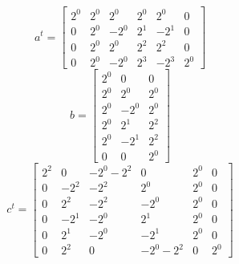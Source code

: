 \documentclass{article}%
\begin{document}
\[%
a^{t} = \left[\begin{matrix}2^{0} & 2^{0} & 2^{0} & 2^{0} & 2^{0} & 0\\0 & 2^{0} & - 2^{0} & 2^{1} & - 2^{1} & 0\\0 & 2^{0} & 2^{0} & 2^{2} & 2^{2} & 0\\0 & 2^{0} & - 2^{0} & 2^{3} & - 2^{3} & 2^{0}\end{matrix}\right]%
\]%
\[%
b = \left[\begin{matrix}2^{0} & 0 & 0\\2^{0} & 2^{0} & 2^{0}\\2^{0} & - 2^{0} & 2^{0}\\2^{0} & 2^{1} & 2^{2}\\2^{0} & - 2^{1} & 2^{2}\\0 & 0 & 2^{0}\end{matrix}\right]%
\]%
\[%
c^{t} = \left[\begin{matrix}2^{2} & 0 & - 2^{0} - 2^{2} & 0 & 2^{0} & 0\\0 & - 2^{2} & - 2^{2} & 2^{0} & 2^{0} & 0\\0 & 2^{2} & - 2^{2} & - 2^{0} & 2^{0} & 0\\0 & - 2^{1} & - 2^{0} & 2^{1} & 2^{0} & 0\\0 & 2^{1} & - 2^{0} & - 2^{1} & 2^{0} & 0\\0 & 2^{2} & 0 & - 2^{0} - 2^{2} & 0 & 2^{0}\end{matrix}\right]%
\]%
\end{document}
